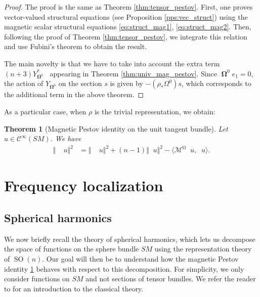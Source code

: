 \documentclass[12pt]{amsart}
\numberwithin{numbering}{section}
\theoremstyle{plain}
\newtheorem{thm}[numbering]{Theorem}
\theoremstyle{definition}
\theoremstyle{remark}
\numberwithin{equation}{section}
\DeclareMathOperator{\SO}{SO}
\DeclareMathOperator{\nv}{\nabla_{\mathbb{V}}}
\DeclareMathOperator{\xs}{\mathbb{X}^{\mg}}
\DeclareMathOperator{\oo}{\mathbf{\Omega}}
\DeclareMathOperator{\mg}{\Omega}
\begin{document}
\begin{proof}
The proof is the same as Theorem \ref{thm:tensor_pestov}. First, one proves vector-valued structural equations (see Proposition \ref{pps:vec_struct}) using the magnetic scalar structural equations \eqref{eq:struct_mag1}, \eqref{eq:struct_mag2}. Then, following the proof of Theorem \ref{thm:tensor_pestov}, we integrate this relation and use Fubini's theorem to obtain the result.

The main novelty is that we have to take into account the extra term $(n+3) Y_{\oo^0}^* \xs$ appearing in Theorem \ref{thm:univ_mag_pestov}. Since $\oo^0 e_1 = 0$, the action of $Y_{\oo^0}$ on the section $s$ is given by $- (\rho_* \Omega^0) s$, which corresponds to the additional term in the above theorem.
\end{proof}

As a particular case, when $\rho$ is the trivial representation, we obtain:
\begin{thm}[Magnetic Pestov identity on the unit tangent bundle] \label{thm:mag_pestov_sm}
Let $u \in \mathcal{C}^\infty(SM)$. We have 
\begin{align*}
\Vert \nv \xs u \Vert^2 &= \Vert \xs \nv u \Vert^2 + (n-1) \Vert \xs u \Vert^2 - \langle \mathcal{M}^{\mg} \nv u, \nv u \rangle.
\end{align*}
\end{thm}

\section{Frequency localization} \label{sec:freq_loc}

\subsection{Spherical harmonics} \label{sec:spherical_harmonics}

We now briefly recall the theory of spherical harmonics, which lets us decompose the space of functions on the sphere bundle $SM$ using the representation theory of $\SO(n)$. Our goal will then be to understand how the magnetic Pestov identity \ref{thm:mag_pestov_sm} behaves with respect to this decomposition. For simplicity, we only consider functions on $SM$ and not sections of tensor bundles. We refer the reader to \cite[Chapter 14]{lefeuvre2024microlocal} for an introduction to the classical theory.
\end{document}
